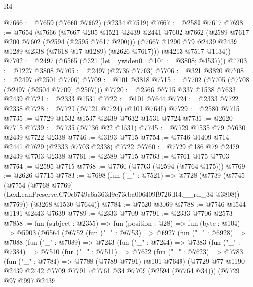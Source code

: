 \begin{lexlean}{R4}
\begin{coremodule}
@7666 := @7659 (@7660 @7662) (@2334 @7519)
@7667 := @2580 @7617
@7698 := @7654
    (@7666
      (@7667
        @205
        @1521
        @2439
        @2441
        @7602
        @7662
        (@2589 @7617 @200 @7602 (@2594 (@2595 @7617 @200)))
        (@7667 @1290 @79 @2439 @2439 @1289 @2338 (@7618 @17 @1289) (@2626 @7617)))
      (@4213 @7517 @1134))
@7702 := @2497 (@6565 (@321 (let _ywiden0 : @104 := @3808; @4537)))
@7703 := @1227 @3808
@7705 := @2497 (@2736 @7703)
@7706 := @321 @3820
@7708 := @2497 (@2501 @7706)
@7709 := @101 @3818
@7715 := @7702 (@7705 (@7708 (@2497 (@2504 @7709) @2507)))
@7720 := @2566 @7715 @337 @1538 @7633 @2439
@7721 := @2333 @1531
@7722 := @101 @7644
@7724 := @2333 @7722 @2338
@7728 := @7720 (@7721 @7724) (@101 @7645)
@7729 := @2580 @7715
@7735 := @7729 @1532 @1537 @2439 @7632 @1531 @7724
@7736 := @2620 @7715
@7739 := @7735 (@7736 @22 @1531)
@7745 := @7729 @1535 @79 @7630 @2439 @7722 @2338
@7746 := @3193 @7715
@7754 := @7746 @1409 @714 @2441 @7629 (@2333 @7703 @2338) @7722
@7760 := @7729 @186 @79 @2439 @2439 @7703 @2338
@7761 := @2589 @7715
@7763 := @7761 @175 @7703
@7764 := @2595 @7715
@7768 := @7760 (@7763 (@2594 (@7764 @175)))
@7769 := @2626 @7715
@7783 := @7698
    (fun ("_" : @7521) =>
    @7728
      (@7739
        (@7745
          (@7754
            (@7768 @7769)
            (LexLeanPreserve.C70c6749a6a363d9e73eba006409f9726.R4.__rel_34 @3808))
          @7769))
      (@3268 @1530 @7644))
@7784 := @7520 @3069
@7788 := @7746 @1544 @1191 @2443 @7639
@7789 := @2333 @7709
@7791 := @2333 @7706 @2573
@7858 := fun (subject : @2355) =>
  fun (position : @28) =>
  fun (byte : @104) =>
  @5903
    (@6564
      (@6752
        (fun ("_" : @6753) =>
        @6927
          (fun ("_" : @6928) =>
          @7088
            (fun ("_" : @7089) =>
            @7243
              (fun ("_" : @7244) =>
              @7383
                (fun ("_" : @7384) =>
                @7510
                  (fun ("_" : @7511) =>
                  @7622
                    (fun ("_" : @7623) =>
                    @7783
                      (fun ("_" : @7784) =>
                      @7788
                        (@7789 @7791)
                        (@101 @7649)
                        (@7729
                          @77
                          @1190
                          @2439
                          @2442
                          @7709
                          @7791
                          (@7761 @34 @7709 (@2594 (@7764 @34)))
                          (@7729
                            @97
                            @997
                            @2439

\end{coremodule}
\end{lexlean}
